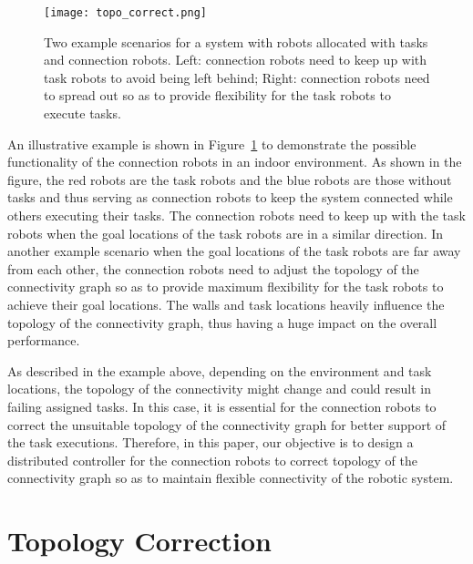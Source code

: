\documentclass[../main.tex]{subfiles}
\begin{document}
\begin{figure}
    \centering
    \texttt{[image: topo\_correct.png]}
    \setlength{\belowcaptionskip}{-14pt}
    \caption{Two example scenarios for a system with robots allocated with tasks and connection robots. Left: connection robots need to keep up with task robots to avoid being left behind; Right: connection robots need to spread out so as to provide flexibility for the task robots to execute tasks.}
    \label{fig:prob_example}
\end{figure}

An illustrative example is shown in Figure~\ref{fig:prob_example} to demonstrate the possible functionality of the connection robots in an indoor environment. As shown in the figure, the red robots are the task robots and the blue robots are those without tasks and thus serving as connection robots to keep the system connected while others executing their tasks. The connection robots need to keep up with the task robots when the goal locations of the task robots are in a similar direction. In another example scenario when the goal locations of the task robots are far away from each other, the connection robots need to adjust the topology of the connectivity graph so as to provide maximum flexibility for the task robots to achieve their goal locations. The walls and task locations heavily influence the topology of the connectivity graph, thus having a huge impact on the overall performance.

As described in the example above, depending on the environment and task locations, the topology of the connectivity might change and could result in failing assigned tasks. In this case, it is essential for the connection robots to correct the unsuitable topology of the connectivity graph for better support of the task executions. Therefore, in this paper, our objective is to design a distributed controller for the connection robots to correct topology of the connectivity graph so as to maintain flexible connectivity of the robotic system.

\section{Topology Correction}
\end{document}

